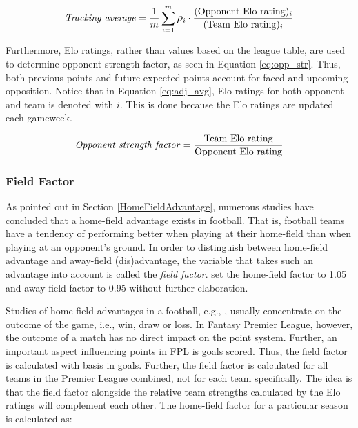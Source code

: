 \begin{equation}
\textrm{\textit{Tracking average}} = \frac{1}{m}\sum_{i=1}^m \rho_i \cdot \frac{(\mathrm{Opponent \ Elo \ rating})_i}{(\mathrm{Team \ Elo \ rating})_i}
\label{eq:adj_avg}
\end{equation}

Furthermore, Elo ratings, rather than values based on the league table, are used to determine opponent strength factor, as seen in Equation \ref{eq:opp_str}. Thus, both previous points and future expected points account for faced and upcoming opposition. Notice that in Equation \ref{eq:adj_avg}, Elo ratings for both opponent and team is denoted with $i$. This is done because the Elo ratings are updated each gameweek.



\begin{equation}
\textrm{\textit{Opponent strength factor}} = \frac{\textrm{Team Elo rating}}{\textrm{Opponent Elo rating}}
\label{eq:opp_str}
\end{equation}


\subsubsection{Field Factor}
As pointed out in Section \ref{HomeFieldAdvantage}, numerous studies have concluded that a home-field advantage exists in football. That is, football teams have a tendency of performing better when playing at their home-field than when playing at an opponent's ground. In order to distinguish between home-field advantage and away-field (dis)advantage, the variable that takes such an advantage into account is called the \textit{field factor}. \cite{Bonomo} set the home-field factor to 1.05 and away-field factor to 0.95 without further elaboration. 

\newpar

Studies of home-field advantages in a football, e.g., \cite{Pollard}, usually concentrate on the outcome of the game, i.e., win, draw or loss. In Fantasy Premier League, however, the outcome of a match has no direct impact on the point system. Further, an important aspect influencing points in FPL is goals scored. Thus, the field factor is calculated with basis in goals. Further, the field factor is calculated for all teams in the Premier League combined, not for each team specifically. The idea is that the field factor alongside the relative team strengths calculated by the Elo ratings will complement each other. The home-field factor for a particular season is calculated as:


